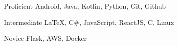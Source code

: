 


\begin{cvskills}


\cvskill
{Proficient} %
{Android, Java, Kotlin, Python, Git, Github} %


\cvskill
{Intermediate} %
{LaTeX, C\#, JavaScript, ReactJS, C, Linux} %


\cvskill
{Novice} %
{Flask, AWS, Docker} %


\end{cvskills}